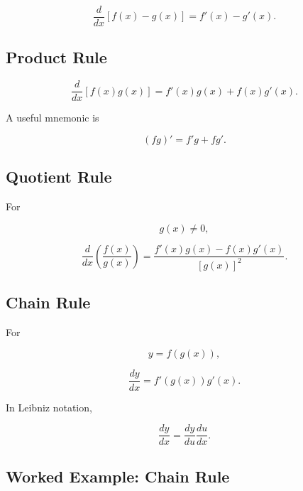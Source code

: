 \[
\boxed{
\frac{d}{dx}
[f(x)-g(x)]
=
f'(x)-g'(x).
}
\]

\subsection{Product Rule}
\label{subsec:product-derivative-rule}

\[
\boxed{
\frac{d}{dx}
[f(x)g(x)]
=
f'(x)g(x)
+
f(x)g'(x).
}
\]

A useful mnemonic is

\[
\boxed{
(fg)'
=
f'g+fg'.
}
\]

\subsection{Quotient Rule}
\label{subsec:quotient-derivative-rule}

For

\[
g(x)\neq0,
\]

\[
\boxed{
\frac{d}{dx}
\left(
\frac{f(x)}{g(x)}
\right)
=
\frac{
f'(x)g(x)-f(x)g'(x)
}{
[g(x)]^2
}.
}
\]

\subsection{Chain Rule}
\label{subsec:chain-derivative-rule}

For

\[
y=f(g(x)),
\]

\[
\boxed{
\frac{dy}{dx}
=
f'(g(x))g'(x).
}
\]

In Leibniz notation,

\[
\boxed{
\frac{dy}{dx}
=
\frac{dy}{du}
\frac{du}{dx}.
}
\]

\subsection{Worked Example: Chain Rule}
\label{subsec:worked-chain-rule-reference}

